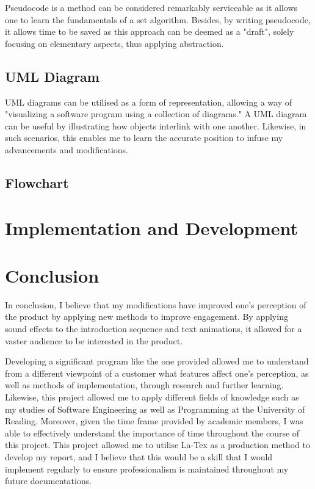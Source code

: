 \documentclass{article}
\begin{document}
Pseudocode is a method can be considered remarkably serviceable as it allows one to learn the fundamentals of a set algorithm. Besides, by writing pseudocode, it allows time to be saved as this approach can be deemed as a "draft", solely focusing on elementary aspects, thus applying abstraction.




\subsection{UML Diagram}\label{sec:uml}
UML diagrams can be utilised as a form of representation, allowing a way of "visualizing a software program using a collection of diagrams." \cite{UML} A UML diagram can be useful by illustrating how objects interlink with one another.  Likewise, in such scenarios, this enables me to learn the accurate position to infuse my advancements and modifications.

\subsection{Flowchart}\label{sec:flowcharts}

\section{Implementation and Development}

\newpage
\section{Conclusion}
In conclusion, I believe that my modifications have improved one's perception of the product by applying new methods to improve engagement. By applying sound effects to the introduction sequence and text animations, it allowed for a vaster audience to be interested in the product.

Developing a significant program like the one provided allowed me to understand from a different viewpoint of a customer what features affect one's perception, as well as methods of implementation, through research and further learning. Likewise, this project allowed me to apply different fields of knowledge such as my studies of Software Engineering as well as Programming at the University of Reading. Moreover, given the time frame provided by academic members, I was able to effectively understand the importance of time throughout the course of this project. This project allowed me to utilise La-Tex as a production method to develop my report, and I believe that this would be a skill that I would implement regularly to ensure professionalism is maintained throughout my future documentations.
\end{document}
